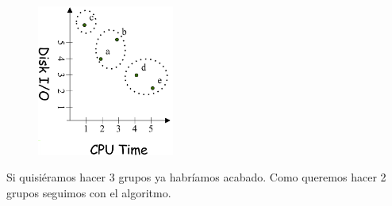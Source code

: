 \begin{figure}[H]
    \centering
    \includegraphics[width=0.4\textwidth]{Images/MST1.png}
\end{figure}
Si quisiéramos hacer 3 grupos ya habríamos acabado. Como queremos hacer 2 grupos seguimos con el algoritmo.
